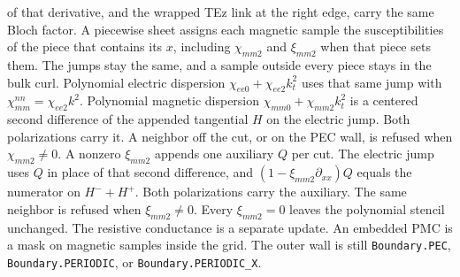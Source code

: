 \documentclass[11pt,a4paper]{article}
\begin{document}
of that derivative, and the wrapped TEz link at the right edge, carry
the same Bloch factor. A piecewise sheet assigns each magnetic sample
the susceptibilities of the piece that contains its $x$, including
$\chi_{mm2}$ and $\xi_{mm2}$ when that piece sets them. The jumps
stay the same, and a sample outside every piece stays in the bulk curl.
Polynomial electric dispersion $\chi_{ee0}+\chi_{ee2}k_t^2$ uses that
same jump with $\chi_{mm}^{nn}=\chi_{ee2}k^2$. Polynomial magnetic
dispersion $\chi_{mm0}+\chi_{mm2}k_t^2$ is a centered second difference
of the appended tangential $H$ on the electric jump. Both polarizations
carry it. A neighbor off the cut, or on the PEC wall, is refused when
$\chi_{mm2}\ne 0$. A nonzero $\xi_{mm2}$ appends one auxiliary $Q$ per
cut. The electric jump uses $Q$ in place of that second difference, and
$(1-\xi_{mm2}\partial_{xx})Q$ equals the numerator on $H^-+H^+$. Both
polarizations carry the auxiliary. The same neighbor is refused when
$\xi_{mm2}\ne 0$. Every $\xi_{mm2}=0$ leaves the polynomial stencil
unchanged. The
resistive conductance is a separate update. An embedded PMC is a mask on magnetic samples inside
the grid. The outer wall is still \texttt{Boundary.PEC},
\texttt{Boundary.PERIODIC}, or \texttt{Boundary.PERIODIC\_X}.
\end{document}
